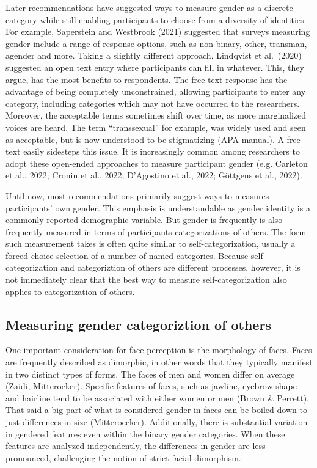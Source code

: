 \documentclass[
  man]{apa7}
\begin{document}
Later recommendations have suggested ways to measure gender as a discrete category while still enabling participants to choose from a diversity of identities. For example, Saperstein and Westbrook (2021) suggested that surveys measuring gender include a range of response options, such as non-binary, other, transman, agender and more. Taking a slightly different approach, Lindqvist et al.~(2020) suggested an open text entry where participants can fill in whatever. This, they argue, has the most benefits to respondents. The free text response has the advantage of being completely unconstrained, allowing participants to enter any category, including categories which may not have occurred to the researchers. Moreover, the acceptable terms sometimes shift over time, as more marginalized voices are heard. The term ``transsexual'' for example, was widely used and seen as acceptable, but is now understood to be stigmatizing (APA manual). A free text easily sidesteps this issue. It is increasingly common among researchers to adopt these open-ended approaches to measure participant gender (e.g. Carleton et al., 2022; Cronin et al., 2022; D'Agostino et al., 2022; Göttgens et al., 2022).

Until now, most recommendations primarily suggest ways to measures participants' own gender. This emphasis is understandable as gender identity is a commonly reported demographic variable. But gender is frequently is also frequently measured in terms of participants categorizations of others. The form such measurement takes is often quite similar to self-categorization, usually a forced-choice selection of a number of named categories. Because self-categorization and categoriztion of others are different processes, however, it is not immediately clear that the best way to measure self-categorization also applies to categorization of others.

\hypertarget{measuring-gender-categoriztion-of-others}{%
\subsection{Measuring gender categoriztion of others}\label{measuring-gender-categoriztion-of-others}}

One important consideration for face perception is the morphology of faces. Faces are frequently described as dimorphic, in other words that they typically manifest in two distinct types of forms. The faces of men and women differ on average (Zaidi, Mitteroeker). Specific features of faces, such as jawline, eyebrow shape and hairline tend to be associated with either women or men (Brown \& Perrett). That said a big part of what is considered gender in faces can be boiled down to just differences in size (Mitteroecker). Additionally, there is substantial variation in gendered features even within the binary gender categories. When these features are analyzed independently, the differences in gender are less pronounced, challenging the notion of strict facial dimorphism.
\end{document}
